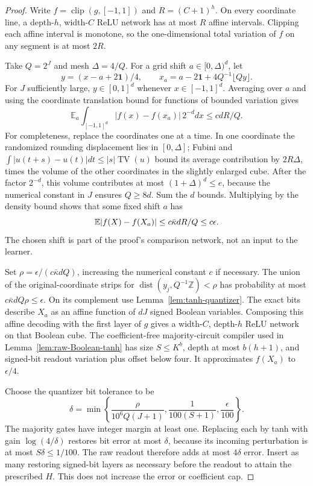 \begin{proof}
Write $f=\operatorname{clip}(g,[-1,1])$ and $R=(C+1)^h$.
On every coordinate line, a depth-$h$, width-$C$ ReLU network has at most
$R$ affine intervals.  Clipping each affine interval is monotone, so the
one-dimensional total variation of $f$ on any segment is at most $2R$.

Take $Q=2^J$ and mesh $\Delta=4/Q$.  For a grid shift
$a\in[0,\Delta)^d$, let
\[
 y=(x-a+2\mathbf 1)/4,\qquad
 x_a=a-2\mathbf 1+4Q^{-1}\lfloor Qy\rfloor.
\]
For $J$ sufficiently large, $y\in[0,1]^d$ whenever
$x\in[-1,1]^d$.  Averaging over $a$ and using the coordinate translation
bound for functions of bounded variation gives
\[
 \mathbb E_a\int_{[-1,1]^d}|f(x)-f(x_a)|\,2^{-d}dx\le c dR/Q.
\]
For completeness, replace the coordinates one at a time.  In one
coordinate the randomized rounding displacement lies in $[0,\Delta]$;
Fubini and
$\int|u(t+s)-u(t)|dt\le |s|\operatorname{TV}(u)$
bound its average contribution by $2R\Delta$, times the volume of the
other coordinates in the slightly enlarged cube.  After the factor $2^{-d}$,
this volume contributes at most $(1+\Delta)^d\le e$, because the numerical
constant in $J$ ensures $Q\ge8d$.  Sum the $d$ bounds.
Multiplying by the density bound shows that some fixed shift $a$ has
\[
 \mathbb E|f(X)-f(X_a)|\le c\bar\kappa dR/Q\le c\epsilon.
\]
The chosen shift is part of the proof's comparison network, not an input
to the learner.

Set $\rho=\epsilon/(c\bar\kappa dQ)$, increasing the numerical constant
$c$ if necessary.
The union of the original-coordinate strips for
$\operatorname{dist}(y_j,Q^{-1}\mathbb Z)<\rho$ has probability at most
$c\bar\kappa dQ\rho\le\epsilon$.  On its complement use
Lemma~\ref{lem:tanh-quantizer}.  The exact bits describe $X_a$ as an affine
function of $dJ$ signed Boolean variables.  Composing this affine decoding
with the first layer of $g$ gives a width-$C$, depth-$h$ ReLU network on
that Boolean cube.  The coefficient-free majority-circuit compiler used
in Lemma~\ref{lem:raw-Boolean-tanh} has size $S\le K^b$, depth
at most $b(h+1)$, and signed-bit readout variation plus offset below four.
It approximates $f(X_a)$ to $\epsilon/4$.

Choose the quantizer bit tolerance to be
\[
 \delta=\min\left\{\frac{\rho}{10^6Q(J+1)},
                    \frac1{100(S+1)},\frac\epsilon{100}\right\}.
\]
The majority gates have integer margin at least one.  Replacing each
by tanh with gain $\log(4/\delta)$ restores bit error at most $\delta$,
because its incoming perturbation is at most $S\delta\le1/100$.
The raw readout therefore adds at most $4\delta$ error.  Insert as many
restoring signed-bit layers as necessary before the readout to attain the
prescribed $H$.  This does not increase the error or coefficient cap.


\end{proof}

